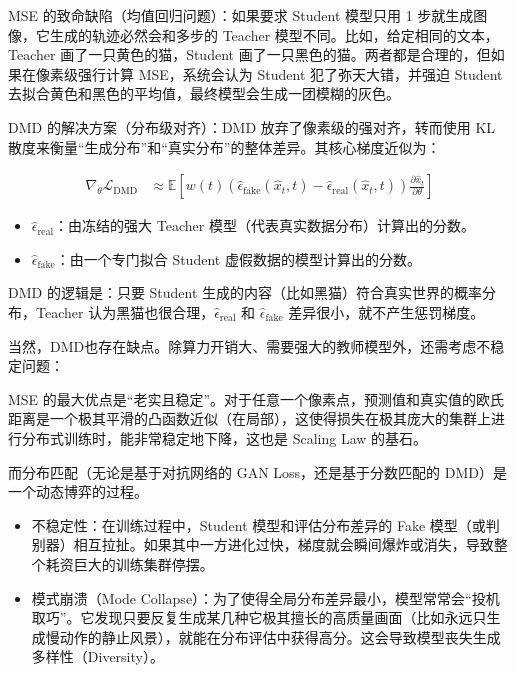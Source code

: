 MSE 的致命缺陷（均值回归问题）：如果要求 Student 模型只用 1 步就生成图像，它生成的轨迹必然会和多步的 Teacher 模型不同。比如，给定相同的文本，Teacher 画了一只黄色的猫，Student 画了一只黑色的猫。两者都是合理的，但如果在像素级强行计算 MSE，系统会认为 Student 犯了弥天大错，并强迫 Student 去拟合黄色和黑色的平均值，最终模型会生成一团模糊的灰色。

DMD 的解决方案（分布级对齐）：DMD 放弃了像素级的强对齐，转而使用 KL 散度来衡量``生成分布''和``真实分布''的整体差异。其核心梯度近似为：

\[
\begin{aligned}
\nabla_\theta\mathcal{L}_{\mathrm{DMD}}
&\approx
\mathbb{E}\left[
w(t)
\left(\hat{\epsilon}_{\mathrm{fake}}(\hat{x}_t,t)-\hat{\epsilon}_{\mathrm{real}}(\hat{x}_t,t)\right)
\frac{\partial\hat{x}_t}{\partial\theta}
\right]
\end{aligned}
\]

\begin{itemize}
\tightlist
\item
  \(\hat{\epsilon}_{\mathrm{real}}\)：由冻结的强大 Teacher 模型（代表真实数据分布）计算出的分数。
\item
  \(\hat{\epsilon}_{\mathrm{fake}}\)：由一个专门拟合 Student 虚假数据的模型计算出的分数。
\end{itemize}

DMD 的逻辑是：只要 Student 生成的内容（比如黑猫）符合真实世界的概率分布，Teacher 认为黑猫也很合理，\(\hat{\epsilon}_{\mathrm{real}}\) 和 \(\hat{\epsilon}_{\mathrm{fake}}\) 差异很小，就不产生惩罚梯度。

当然，DMD也存在缺点。除算力开销大、需要强大的教师模型外，还需考虑不稳定问题：

MSE 的最大优点是``老实且稳定''。对于任意一个像素点，预测值和真实值的欧氏距离是一个极其平滑的凸函数近似（在局部），这使得损失在极其庞大的集群上进行分布式训练时，能非常稳定地下降，这也是 Scaling Law 的基石。

而分布匹配（无论是基于对抗网络的 GAN Loss，还是基于分数匹配的 DMD）是一个动态博弈的过程。

\begin{itemize}
\tightlist
\item
  不稳定性：在训练过程中，Student 模型和评估分布差异的 Fake 模型（或判别器）相互拉扯。如果其中一方进化过快，梯度就会瞬间爆炸或消失，导致整个耗资巨大的训练集群停摆。
\item
  模式崩溃（Mode Collapse）：为了使得全局分布差异最小，模型常常会``投机取巧''。它发现只要反复生成某几种它极其擅长的高质量画面（比如永远只生成慢动作的静止风景），就能在分布评估中获得高分。这会导致模型丧失生成多样性（Diversity）。
\end{itemize}

